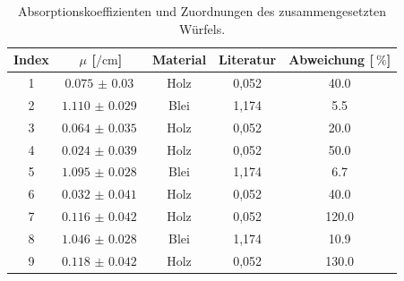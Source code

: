\begin{table}
    \centering
    \caption{Absorptionskoeffizienten und Zuordnungen des zusammengesetzten Würfels.}
    \label{tab:wurfel4}
    \begin{tabular}{c c c c c}
      \toprule
      {Index} & $\mu$ [$\si{\per\centi\meter}$] & {Material}
                & Literatur & Abweichung [$\SI{}{\percent}$]\\
      \midrule
       1 & $\SI{0.075(30)}{}$ & Holz  & 0,052 & 40.0  \\
       2 & $\SI{1.110(29)}{}$ & Blei  & 1,174 & 5.5  \\
       3 & $\SI{0.064(35)}{}$ & Holz  & 0,052 & 20.0  \\
       4 & $\SI{0.024(39)}{}$ & Holz  & 0,052 & 50.0  \\
       5 & $\SI{1.095(28)}{}$ & Blei  & 1,174 & 6.7  \\
       6 & $\SI{0.032(41)}{}$ & Holz  & 0,052 & 40.0  \\
       7 & $\SI{0.116(42)}{}$ & Holz  & 0,052 &  120.0  \\
       8 & $\SI{1.046(28)}{}$ & Blei  & 1,174 & 10.9  \\
       9 & $\SI{0.118(42)}{}$ & Holz  & 0,052 & 130.0  \\
      \bottomrule
    \end{tabular}
\end{table}
